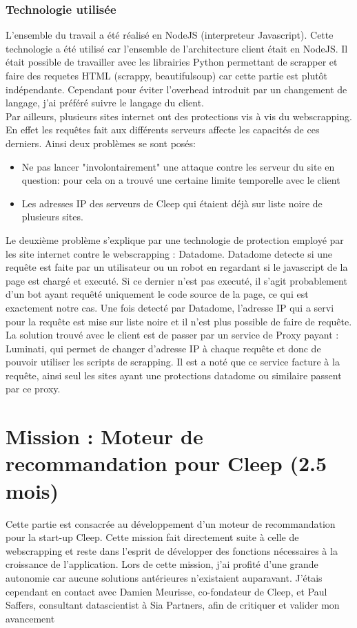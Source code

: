 \documentclass{article} %
\begin{document}
\subsubsection{Technologie utilisée\\}
L'ensemble du travail a été réalisé en NodeJS (interpreteur Javascript). Cette technologie a été utilisé car l'ensemble de l'architecture client était en NodeJS. Il était possible de travailler avec les librairies Python permettant de scrapper et faire des requetes HTML (scrappy, beautifulsoup) car cette partie est plutôt indépendante. Cependant pour éviter l'overhead introduit par un changement de langage, j'ai préféré suivre le langage du client.\\
Par ailleurs, plusieurs sites internet ont des protections vis à vis du webscrapping. En effet les requêtes fait aux différents serveurs affecte les capacités de ces derniers. Ainsi deux problèmes se sont posés:
\begin{itemize}
	\itemsep 0em
	\item Ne pas lancer "involontairement" une attaque contre les serveur du site en question: pour cela on a trouvé une certaine limite temporelle avec le client
	\item Les adresses IP des serveurs de Cleep qui étaient déjà sur liste noire de plusieurs sites.
\end{itemize}

Le deuxième problème s'explique par une technologie de protection employé par les site internet contre le webscrapping : Datadome. Datadome detecte si une requête est faite par un utilisateur ou un robot en regardant si le javascript de la page est chargé et executé. Si ce dernier n'est pas executé, il s'agit probablement d'un bot ayant requêté uniquement le code source de la page, ce qui est exactement notre cas. Une fois detecté par Datadome, l'adresse IP qui a servi pour la requête est mise sur liste noire et il n'est plus possible de faire de requête.\\

La solution trouvé avec le client est de passer par un service de Proxy payant : Luminati, qui permet de changer d'adresse IP à chaque requête et donc de pouvoir utiliser les scripts de scrapping. Il est a noté que ce service facture à la requête, ainsi seul les sites ayant une protections datadome ou similaire passent par ce proxy.

\newpage

\section{Mission : Moteur de recommandation pour Cleep (2.5 mois)}
Cette partie est consacrée au développement d'un moteur de recommandation pour la start-up Cleep. Cette mission fait directement suite à celle de webscrapping et reste dans l'esprit de développer des fonctions nécessaires à la croissance de l'application. Lors de cette mission, j'ai profité d'une grande autonomie car aucune solutions antérieures n'existaient auparavant. J'étais cependant en contact avec Damien Meurisse, co-fondateur de Cleep, et Paul Saffers, consultant datascientist à Sia Partners, afin de critiquer et valider mon avancement 
\end{document}
